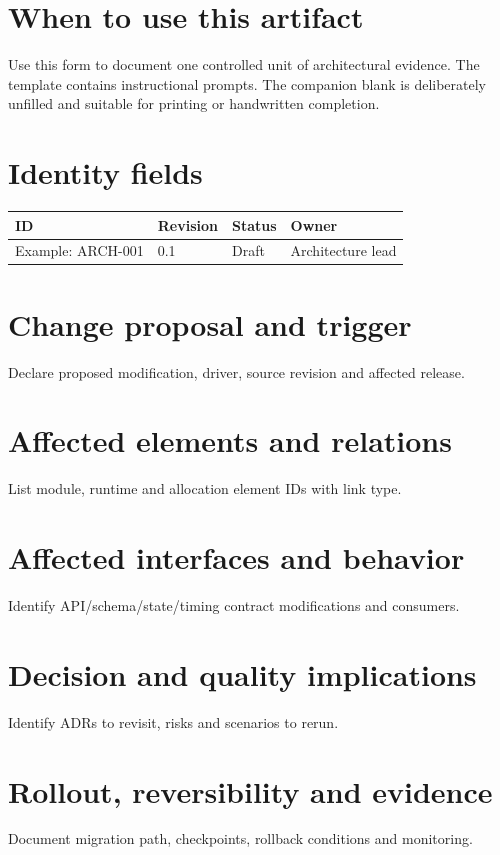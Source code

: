 \documentclass[10pt,letterpaper]{article}
\begin{document}
\DocProvenance
\section{When to use this artifact}
Use this form to document one controlled unit of architectural evidence. The template contains instructional prompts. The companion blank is deliberately unfilled and suitable for printing or handwritten completion.

\section{Identity fields}
\small
\begin{tabularx}{\linewidth}{@{}YYYY@{}}
\toprule
\textbf{ID} & \textbf{Revision} & \textbf{Status} & \textbf{Owner} \\
\midrule
Example: ARCH-001 & 0.1 & Draft & Architecture lead \\
\bottomrule
\end{tabularx}
\normalsize
\section{Change proposal and trigger}
Declare proposed modification, driver, source revision and affected release.

\section{Affected elements and relations}
List module, runtime and allocation element IDs with link type.

\section{Affected interfaces and behavior}
Identify API/schema/state/timing contract modifications and consumers.

\section{Decision and quality implications}
Identify ADRs to revisit, risks and scenarios to rerun.

\section{Rollout, reversibility and evidence}
Document migration path, checkpoints, rollback conditions and monitoring.
\end{document}
